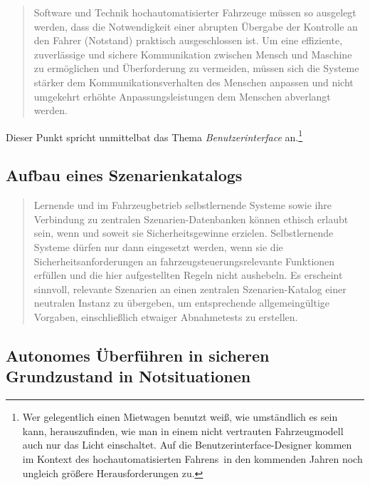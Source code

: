 \documentclass[twoside,a4paper,12pt]{article}
\begin{document}
\begin{quote}
\glqq
Software und Technik hochautomatisierter Fahrzeuge müssen so ausgelegt werden, dass
die Notwendigkeit einer abrupten Übergabe der Kontrolle an den Fahrer (\glqq Notstand\grqq)
praktisch ausgeschlossen ist. Um eine effiziente, zuverlässige und sichere Kommunikation zwischen Mensch und Maschine zu 
ermöglichen und Überforderung zu vermeiden,
müssen sich die Systeme stärker dem Kommunikationsverhalten des Menschen anpassen
und nicht umgekehrt erhöhte Anpassungsleistungen dem Menschen abverlangt werden.\grqq\mbox{~\cite[S. 13]{ek}}
\end{quote}

Dieser Punkt spricht unmittelbat das Thema \textit{Benutzerinterface} an.\footnote{Wer gelegentlich einen Mietwagen benutzt weiß, wie 
umständlich es sein kann, herauszufinden, wie man in einem nicht vertrauten Fahrzeugmodell auch nur das Licht einschaltet. Auf die
Benutzerinterface-Designer kommen im Kontext des \glqq hochautomatisierten Fahrens\grqq\ in den kommenden Jahren noch ungleich größere
Herausforderungen zu.}

\subsection{Aufbau eines Szenarienkatalogs} \label{AufbauEinesSzenarienkatalogs}

\begin{quote}
\glqq
Lernende und im Fahrzeugbetrieb selbstlernende Systeme sowie ihre Verbindung zu zentralen Szenarien-Datenbanken 
können ethisch erlaubt sein, wenn und soweit sie Sicherheitsgewinne erzielen. Selbstlernende Systeme dürfen nur dann eingesetzt werden, wenn
sie die Sicherheitsanforderungen an fahrzeugsteuerungsrelevante Funktionen erfüllen
und die hier aufgestellten Regeln nicht aushebeln. Es erscheint sinnvoll, relevante Szenarien an einen zentralen 
Szenarien-Katalog einer neutralen Instanz zu übergeben, um
entsprechende allgemeingültige Vorgaben, einschließlich etwaiger Abnahmetests zu erstellen.\grqq\mbox{~\cite[S. 13]{ek}}
\end{quote}



\subsection{Autonomes Überführen in sicheren Grundzustand in Notsituationen} \label{AutonomesUeberfuehrenInSicherenGrundzustandInNotsituationen}
\end{document}
